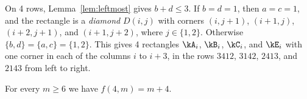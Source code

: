 
On 4 rows, Lemma~\ref{lem:leftmost} gives $b+d\le3$. If $b=d=1$, then $a=c=1$, and the
rectangle is a \emph{diamond} $D(i,j)$ with corners $(i,j+1)$, $(i+1,j)$, $(i+2,j+1)$, and
$(i+1,j+2)$, where $j\in\{1,2\}$. Otherwise $\{b,d\}=\{a,c\}=\{1,2\}$. This gives 4
rectangles $\kA_i$, $\kB_i$, $\kC_i$, and $\kE_i$ with one corner in each of the columns
$i$ to $i+3$, in the rows $3412$, $3142$, $2413$, and $2143$ from left to right.

\begin{proposition}\label{prop:four}
For every $m\ge6$ we have $f(4,m)=m+4$.
\end{proposition}

